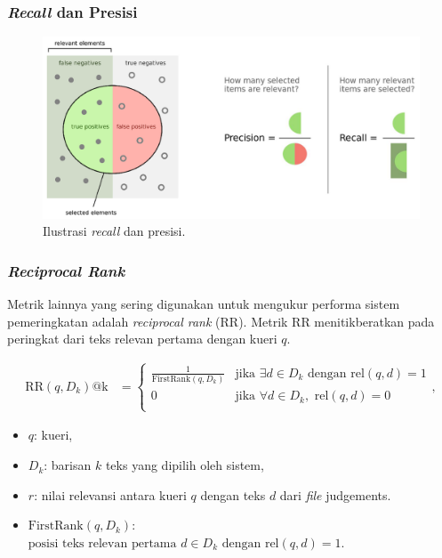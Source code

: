 \documentclass[10pt]{beamer}
\newcommand{\f}[1]{\textit{#1}}
\begin{document}
\begin{frame}
    \frametitle{\f{Recall} dan Presisi}
    \begin{figure}[!ht]
        \centering
        \includegraphics[width=1\textwidth]{assets/pics/recall-presisi.png}
        \caption{Ilustrasi \f{recall} dan presisi.}
        \label{fig:recall-precision}
    \end{figure}
\end{frame}

\begin{frame}
    \frametitle{\f{Reciprocal Rank}}
    Metrik lainnya yang sering digunakan untuk mengukur performa sistem pemeringkatan adalah \f{reciprocal rank} (RR). Metrik RR menitikberatkan pada peringkat dari teks relevan pertama dengan kueri $q$.

        \begin{align*}
            \text{RR}(q, D_k)\text{@k} &= \begin{cases}
                \frac{1}{\text{FirstRank}(q, D_k)} & \text{jika } \exists d \in D_k \text{ dengan } \text{rel}(q, d) = 1 \\        
                0 & \text{jika } \forall d \in D_k, \text{ rel}(q, d) = 0 \\
                \end{cases},
        \end{align*}
        
        \begin{itemize}
            \item $q$: kueri,
            \item $D_k$: barisan $k$ teks yang dipilih oleh sistem,
            \item $r$: nilai relevansi antara kueri $q$ dengan teks $d$ dari \f{file} judgements.
            \item $ \text{FirstRank}(q,D_k)$: $\text{posisi teks relevan pertama } d\in D_k \text{ dengan } \text{rel}(q, d) = 1. $
        \end{itemize}
\end{frame}
\end{document}
